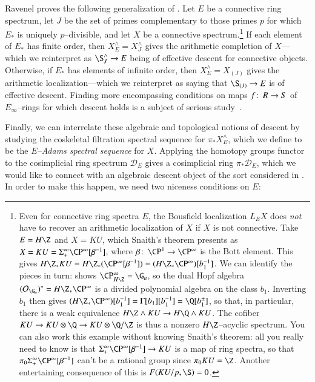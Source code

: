 \begin{remark}
Ravenel proves the following generalization of .  Let $E$ be a connective ring spectrum, let $J$ be the set of primes complementary to those primes $p$ for which $E_*$ is uniquely $p$--divisible, and let $X$ be a connective spectrum.\footnote{Even for connective ring spectra $E$, the Bousfield localization $L_E X$ does \emph{not} have to recover an arithmetic localization of $X$ if $X$ is not connective.  Take $E = H\Z$ and $X = KU$, which Snaith's theorem presents as $X = KU = \Susp^\infty_+ \CP^\infty[\beta^{-1}]$, where $\beta\co \CP^1 \to \CP^\infty$ is the Bott element.  This gives $H\Z_* KU = H\Z_*(\CP^\infty[\beta^{-1}]) = (H\Z_* \CP^\infty)[b_1^{-1}]$.  We can identify the pieces in turn:  shows $\CP^\infty_{H\Z} = \G_a$, so the dual Hopf algebra $(\sheaf O_{\G_a})^* = H\Z_* \CP^\infty$ is a divided polynomial algebra on the class $b_1$.  Inverting $b_1$ then gives $(H\Z_* \CP^\infty)[b_1^{-1}] = \Gamma[b_1][b_1^{-1}] = \Q[b_1^\pm]$, so that, in particular, there is a weak equivalence $H\Z \sm KU \to H\Q \sm KU$.  The cofiber $KU \to KU \otimes \Q \to KU \otimes \Q/\Z$ is thus a nonzero $H\Z$--acyclic spectrum.  You can also work this example without knowing Snaith's theorem: all you really need to know is that $\Susp^\infty_+ \CP^\infty[\beta^{-1}] \to KU$ is a map of ring spectra, so that $\pi_0 \Susp^\infty_+ \CP^\infty[\beta^{-1}]$ can't be a rational group since $\pi_0 KU = \Z$.  Another entertaining consequence of this is $F(KU/p, \S) = 0$.}  If each element of $E_*$ has finite order, then $X^\wedge_E = X^\wedge_J$ gives the arithmetic completion of $X$---which we reinterpret as $\S^\wedge_J \to E$ being of effective descent for connective objects.  Otherwise, if $E_*$ has elements of infinite order, then $X^\wedge_E = X_{(J)}$ gives the arithmetic localization---which we reinterpret as saying that $\S_{(J)} \to E$ is of effective descent.  Finding more encompassing conditions on maps $f\colon\thinspace R \to S$ of $E_\infty$--rings for which descent holds is a subject of serious study~\cite[Appendix D]{LurieSAG}.
\end{remark}

Finally, we can interrelate these algebraic and topological notions of descent by studying the coskeletal filtration spectral sequence for $\pi_* X^\wedge_E$, which we define to be the \textit{$E$--Adams spectral sequence} for $X$.  Applying the homotopy groups functor to the cosimplicial ring spectrum $\mathcal D_E$ gives a cosimplicial ring $\pi_* \mathcal D_E$, which we would like to connect with an algebraic descent object of the sort considered in .  In order to make this happen, we need two niceness conditions on $E$:

